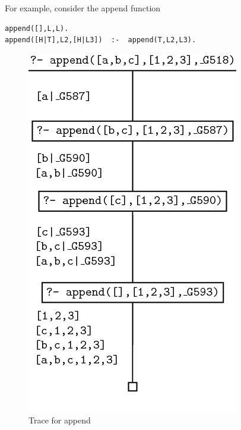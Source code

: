 \documentclass[thesis-solanki.tex]{subfiles}
\begin{document}
\newpage

For example, consider the append function 

\begin{verbatim}
append([],L,L). 
append([H|T],L2,[H|L3])  :-  append(T,L2,L3).
\end{verbatim}


\begin{figure}[h]
\centering
\includegraphics[scale = 0.5]{PrologAppendWorking.png}
\caption{Trace for append \cite{webiste:learnprolognowappend}}
\label{fig:Trace for append}
\end{figure}  

\end{document}
